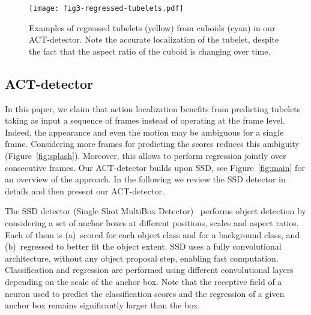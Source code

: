\documentclass[10pt,twocolumn,letterpaper]{article}
\begin{document}
\begin{figure*}[t]
\centering
\texttt{[image: fig3-regressed-tubelets.pdf]}
\vspace{-4mm}
\caption{
Examples of regressed tubelets (yellow) from cuboids (cyan) in our ACT-detector. Note the accurate localization of the tubelet, despite the fact that the aspect ratio of the cuboid is changing over time.}
\label{fig:regression}
\vspace{-5mm}
\end{figure*}


\subsection{ACT-detector}
\label{sub:sstd}

In this paper, we claim that action localization benefits from predicting tubelets taking as input a sequence of frames instead of operating at the frame level. 
Indeed, the appearance and even the motion may be ambiguous for a single frame. 
Considering more frames for predicting the scores reduces this ambiguity (Figure~\ref{fig:splash}). 
Moreover, this allows to perform regression jointly over consecutive frames. Our ACT-detector builds upon SSD, see Figure~\ref{fig:main} for an overview of the approach. 
In the following we review the SSD detector in details and then present our ACT-detector.

The SSD detector (Single Shot MultiBox Detector)~\cite{liu16eccv} performs object detection by considering a
set of anchor boxes at different positions, scales and aspect ratios. 
Each of them is (a)~scored for each object class and for a background class, and (b)~regressed to better fit the object extent.  
SSD uses a fully convolutional architecture, without any object proposal step, enabling fast computation. Classification and regression are performed using different convolutional layers depending on the scale of the anchor
box. 
Note that the receptive field of a neuron used to predict the classification scores and the regression of a given anchor box remains significantly larger than the box. 
\end{document}
